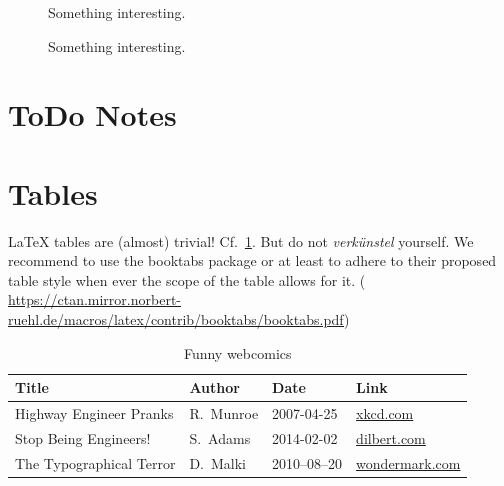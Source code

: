 \begin{figure}[tp]
	\centering
	\scalebox{0.95}{
		}
	\caption{Something interesting.}
	\label{fig:zwei-freiheitsgrade-regelung}
\end{figure}

\begin{figure}[tp]
	\centering
	\scalebox{0.95}{
		}
	\caption{Something interesting.}
	\label{fig:zwei-freiheitsgrade-regelung-zustand}
\end{figure}

	

\section{ToDo Notes}
{}


\listoftodos


\section{Tables}
\LaTeX{} tables are (almost) trivial! Cf.\ \cref{tab:example}. But do not \textit{verkünstel} yourself. We recommend to use the booktabs package or at least to adhere to their proposed table style when ever the scope of the table allows for it. ( \url{https://ctan.mirror.norbert-ruehl.de/macros/latex/contrib/booktabs/booktabs.pdf})

\begin{table}
  \centering
  \caption{Funny webcomics}
  \label{tab:example}
  \begin{tabular}{llll}
    \toprule
    Title                    & Author     & Date         & Link                                                    \\
    \midrule
    Highway Engineer Pranks  & R.\ Munroe & 2007-04-25   & \href{http://xkcd.com/253/}{xkcd.com}                   \\
    Stop Being Engineers!    & S.\ Adams  & 2014-02-02   & \href{http://dilbert.com/strip/2014-02-02}{dilbert.com} \\
    The Typographical Terror & D.\ Malki  & 2010--08--20 & \href{http://wondermark.com/650/}{wondermark.com}       \\
    \bottomrule
  \end{tabular}
\end{table}



